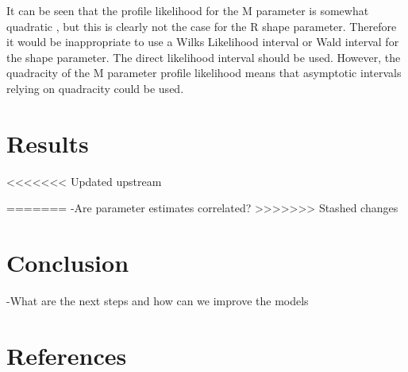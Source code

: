 \documentclass[11pt,preprint, authoryear]{elsarticle}
\numberwithin{equation}{section}
\numberwithin{figure}{section}
\numberwithin{table}{section}
\begin{document}
It can be seen that the profile likelihood for the M parameter is
somewhat quadratic , but this is clearly not the case for the R shape
parameter. Therefore it would be inappropriate to use a Wilks Likelihood
interval or Wald interval for the shape parameter. The direct likelihood
interval should be used. However, the quadracity of the M parameter
profile likelihood means that asymptotic intervals relying on quadracity
could be used.

\section{Results}\label{results}

\textless{}\textless{}\textless{}\textless{}\textless{}\textless{}\textless{}
Updated upstream

======= -Are parameter estimates correlated?
\textgreater{}\textgreater{}\textgreater{}\textgreater{}\textgreater{}\textgreater{}\textgreater{}
Stashed changes

\section{Conclusion}\label{conclusion}

-What are the next steps and how can we improve the models

\section{References}\label{references}

\newpage
\nocite{*}

\end{document}
